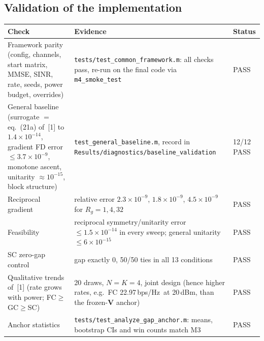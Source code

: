 \documentclass[10pt,a4paper]{article}
\newcommand{\bpsHz}{bps/Hz}
\newcommand{\file}[1]{\texttt{\small #1}}
\begin{document}
\subsection{Validation of the implementation}
\begin{table}[H]\centering\small
\begin{tabularx}{\textwidth}{@{}>{\raggedright\arraybackslash}p{4.1cm}Xl@{}}\toprule
Check & Evidence & Status\\\midrule
Framework parity (config, channels, start matrix, MMSE, SINR, rate, seeds, power budget, overrides) & \file{tests/test\_common\_framework.m}: all checks pass, re-run on the final code via \file{m4\_smoke\_test} & PASS\\
General baseline (surrogate $=$ eq.\ (21a) of~[1] to $1.4\times10^{-14}$, gradient FD error $\le3.7\times10^{-9}$, monotone ascent, unitarity $\approx10^{-15}$, block structure) & \file{test\_general\_baseline.m}, record in \file{Results/diagnostics/baseline\_validation} & 12/12 PASS\\
Reciprocal gradient & relative error $2.3\times10^{-9}$, $1.8\times10^{-9}$, $4.5\times10^{-9}$ for $R_g=1,4,32$ & PASS\\
Feasibility & reciprocal symmetry/unitarity error $\le1.5\times10^{-14}$ in every sweep; general unitarity $\le6\times10^{-15}$ & PASS\\
SC zero-gap control & gap exactly 0, 50/50 ties in all 13 conditions & PASS\\
Qualitative trends of~[1] (rate grows with power; FC$\ge$GC$\ge$SC) & 20 draws, $N{=}K{=}4$, joint design (hence higher rates, e.g.\ FC 22.97\,\bpsHz\ at 20\,dBm, than the frozen-$\mathbf V$ anchor) & PASS\\
Anchor statistics & \file{tests/test\_analyze\_gap\_anchor.m}: means, bootstrap CIs and win counts match M3 & PASS\\\bottomrule
\end{tabularx}
\end{table}
\end{document}
